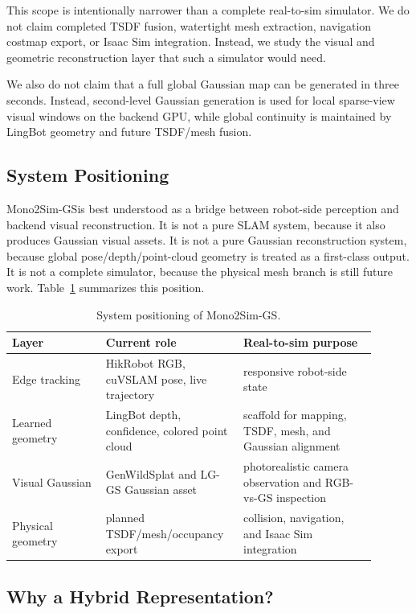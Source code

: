\documentclass[11pt]{article}
\newcommand{\projectname}{Mono2Sim-GS}
\newcommand{\methodabbr}{LG-GS}
\newcommand{\RouteB}{\methodabbr\xspace}
\begin{document}
This scope is intentionally narrower than a complete real-to-sim simulator. We do not claim completed TSDF fusion, watertight mesh extraction, navigation costmap export, or Isaac Sim integration. Instead, we study the visual and geometric reconstruction layer that such a simulator would need.

We also do not claim that a full global Gaussian map can be generated in three seconds. Instead, second-level Gaussian generation is used for local sparse-view visual windows on the backend GPU, while global continuity is maintained by LingBot geometry and future TSDF/mesh fusion.

\subsection{System Positioning}

\projectname is best understood as a bridge between robot-side perception and backend visual reconstruction. It is not a pure SLAM system, because it also produces Gaussian visual assets. It is not a pure Gaussian reconstruction system, because global pose/depth/point-cloud geometry is treated as a first-class output. It is not a complete simulator, because the physical mesh branch is still future work. Table~\ref{tab:positioning} summarizes this position.

\begin{table}[H]
\centering
\caption{System positioning of \projectname.}
\label{tab:positioning}
\begin{tabular}{@{}p{0.24\linewidth}p{0.32\linewidth}p{0.34\linewidth}@{}}
\toprule
\textbf{Layer} & \textbf{Current role} & \textbf{Real-to-sim purpose} \\
\midrule
Edge tracking & HikRobot RGB, cuVSLAM pose, live trajectory & responsive robot-side state \\
Learned geometry & LingBot depth, confidence, colored point cloud & scaffold for mapping, TSDF, mesh, and Gaussian alignment \\
Visual Gaussian & GenWildSplat and \RouteB Gaussian asset & photorealistic camera observation and RGB-vs-GS inspection \\
Physical geometry & planned TSDF/mesh/occupancy export & collision, navigation, and Isaac Sim integration \\
\bottomrule
\end{tabular}
\end{table}

\subsection{Why a Hybrid Representation?}
\end{document}
